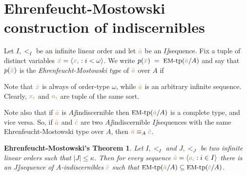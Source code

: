 \documentclass[creche.tex]{subfiles}
\begin{document}
\section{Ehrenfeucht-Mostowski construction of indiscernibles}\label{EM}

Let $I,<_I$ be an infinite linear order and let ${\color{brown}\bar a}$ be an $I\jj$sequence.
Fix a tuple of distinct variables ${\color{brown}\bar x}=\langle{\color{brown}x_i}: i<\omega\rangle$.
We write \emph{$p({\color{brown}\bar x})\;=\;\textrm{{\small EM}-tp}({\color{brown}\bar a}/A)$} and say that $p({\color{brown}\bar x})$ is the \emph{Ehren\-feucht-Mostowski type\/} of ${\color{brown}\bar a}$ over $A$ if


Note that ${\color{brown}\bar x}$ is always of order-type $\omega$,
while ${\color{brown}\bar a}$ is an arbitrary infinite sequence.
Clearly,
${\color{brown} x_i}$ and  ${\color{brown} a_i}$ are tuple of the same sort.

Note also that if ${\color{brown}\bar a}$ is $A\jj$indiscernible then $\textrm{{\small EM}\mbox{-}tp}({\color{brown}\bar a}/A)$ is a complete type,
and vice versa.
So,
if ${\color{brown}\bar a}$ and ${\color{brown}\bar c}$ are two $A\jj$indiscernible $I\jj$sequences with the same Ehren\-feucht-Mostowski type over $A$,
then ${\color{brown}\bar a}\equiv_A {\color{brown}\bar c}$.

\theoremstyle{mio}
\newtheorem{EhrenfeuchtMostowski}[thm]{Ehrenfeucht-Mostowski's Theorem}
\begin{EhrenfeuchtMostowski}\label{thm_EM}
  Let $I,<_I$ and $J,<_J$ be two infinite linear orders such that $|J|\le \kappa$.
Then for every sequence ${\color{brown}\bar a}=\langle{\color{brown}a_i}:i\in I\rangle$ there is an $J\jj$sequence of $A$-indiscernibles ${\color{brown}\bar c}$ such that $\textrm{{\small EM}\mbox{-}tp}({\color{brown}\bar a}/A)\subseteq\textrm{{\small EM}\mbox{-}tp}({\color{brown}\bar c}/A)$.
\end{EhrenfeuchtMostowski}
\end{document}
